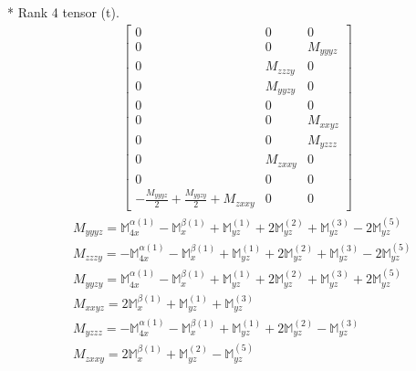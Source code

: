 \documentclass[fleqn,8pt,landscape]{jsarticle}
\begin{document}
* Rank 4 tensor (t).
\begin{align*}
\begin{bmatrix} 0 & 0 & 0 \\ 0 & 0 & M_{yyyz} \\ 0 & M_{zzzy} & 0 \\ 0 & M_{yyzy} & 0 \\ 0 & 0 & 0 \\ 0 & 0 & M_{xxyz} \\ 0 & 0 & M_{yzzz} \\ 0 & M_{zxxy} & 0 \\ 0 & 0 & 0 \\ - \frac{M_{yyyz}}{2} + \frac{M_{yyzy}}{2} + M_{zxxy} & 0 & 0 \end{bmatrix}
\end{align*}
\begin{align*}
& M_{yyyz} = \mathbb{M}_{4x}^{\alpha(1)} - \mathbb{M}_{x}^{\beta(1)} + \mathbb{M}_{yz}^{(1)} + 2 \mathbb{M}_{yz}^{(2)} + \mathbb{M}_{yz}^{(3)} - 2 \mathbb{M}_{yz}^{(5)} \\
& M_{zzzy} = - \mathbb{M}_{4x}^{\alpha(1)} - \mathbb{M}_{x}^{\beta(1)} + \mathbb{M}_{yz}^{(1)} + 2 \mathbb{M}_{yz}^{(2)} + \mathbb{M}_{yz}^{(3)} - 2 \mathbb{M}_{yz}^{(5)} \\
& M_{yyzy} = \mathbb{M}_{4x}^{\alpha(1)} - \mathbb{M}_{x}^{\beta(1)} + \mathbb{M}_{yz}^{(1)} + 2 \mathbb{M}_{yz}^{(2)} + \mathbb{M}_{yz}^{(3)} + 2 \mathbb{M}_{yz}^{(5)} \\
& M_{xxyz} = 2 \mathbb{M}_{x}^{\beta(1)} + \mathbb{M}_{yz}^{(1)} + \mathbb{M}_{yz}^{(3)} \\
& M_{yzzz} = - \mathbb{M}_{4x}^{\alpha(1)} - \mathbb{M}_{x}^{\beta(1)} + \mathbb{M}_{yz}^{(1)} + 2 \mathbb{M}_{yz}^{(2)} - \mathbb{M}_{yz}^{(3)} \\
& M_{zxxy} = 2 \mathbb{M}_{x}^{\beta(1)} + \mathbb{M}_{yz}^{(2)} - \mathbb{M}_{yz}^{(5)}
\end{align*}
\end{document}
